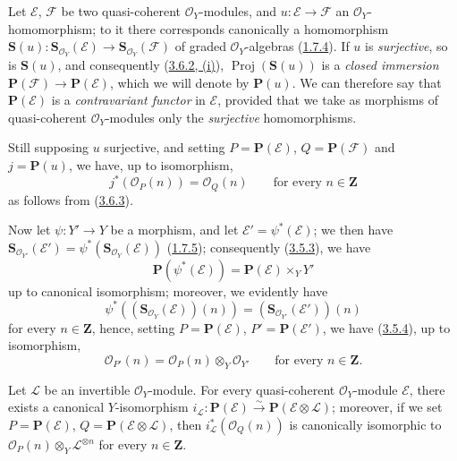 \begin{env}[4.1.2]
\label{II.4.1.2}
Let $\mathcal{E}$, $\mathcal{F}$ be two quasi-coherent
$\mathcal{O}_Y$-modules, and $u:\mathcal{E}\to\mathcal{F}$ an
$\mathcal{O}_Y$-homomorphism; to it there corresponds canonically a
homomorphism
$\mathbf{S}(u):\mathbf{S}_{\mathcal{O}_Y}(\mathcal{E})\to
\mathbf{S}_{\mathcal{O}_Y}(\mathcal{F})$ of graded
$\mathcal{O}_Y$-algebras (\hyperref[II.1.7.4]{1.7.4}). If $u$ is
\emph{surjective}, so is $\mathbf{S}(u)$, and consequently
(\hyperref[II.3.6.2]{3.6.2, (i)}),
$\operatorname{Proj}(\mathbf{S}(u))$ is a \emph{closed immersion}
$\mathbf{P}(\mathcal{F})\to\mathbf{P}(\mathcal{E})$, which we will denote by
$\mathbf{P}(u)$. We can therefore say that $\mathbf{P}(\mathcal{E})$ is a
\emph{contravariant functor} in $\mathcal{E}$, provided that we take as
morphisms of quasi-coherent $\mathcal{O}_Y$-modules only the \emph{surjective}
homomorphisms.

Still supposing $u$ surjective, and setting
$P=\mathbf{P}(\mathcal{E})$, $Q=\mathbf{P}(\mathcal{F})$ and
$j=\mathbf{P}(u)$, we have, up to isomorphism,
\[
\label{II.4.1.2.1}
  j^*(\mathcal{O}_P(n))=\mathcal{O}_Q(n)
  \qquad\text{for every }n\in\mathbf{Z}
\tag{4.1.2.1}
\]
as follows from (\hyperref[II.3.6.3]{3.6.3}).
\end{env}

\begin{env}[4.1.3]
\label{II.4.1.3}
Now let $\psi:Y'\to Y$ be a morphism, and let
$\mathcal{E}'=\psi^*(\mathcal{E})$; we then have
$\mathbf{S}_{\mathcal{O}_{Y'}}(\mathcal{E}')=
\psi^*(\mathbf{S}_{\mathcal{O}_Y}(\mathcal{E}))$
(\hyperref[II.1.7.5]{1.7.5}); consequently
(\hyperref[II.3.5.3]{3.5.3}), we have
\[
\label{II.4.1.3.1}
  \mathbf{P}(\psi^*(\mathcal{E}))=
  \mathbf{P}(\mathcal{E})\times_YY'
\tag{4.1.3.1}
\]
up to canonical isomorphism; moreover, we evidently have
\[
  \psi^*((\mathbf{S}_{\mathcal{O}_Y}(\mathcal{E}))(n))
  =(\mathbf{S}_{\mathcal{O}_{Y'}}(\mathcal{E}'))(n)
\]
for every $n\in\mathbf{Z}$, hence, setting $P=\mathbf{P}(\mathcal{E})$,
$P'=\mathbf{P}(\mathcal{E}')$, we have
(\hyperref[II.3.5.4]{3.5.4}), up to isomorphism,
\[
\label{II.4.1.3.2}
  \mathcal{O}_{P'}(n)=\mathcal{O}_P(n)\otimes_Y\mathcal{O}_{Y'}
  \qquad\text{for every }n\in\mathbf{Z}.
\tag{4.1.3.2}
\]
\end{env}


\begin{proposition}[4.1.4]
\label{II.4.1.4}
Let $\mathcal{L}$ be an invertible $\mathcal{O}_Y$-module. For every
quasi-coherent $\mathcal{O}_Y$-module $\mathcal{E}$, there exists a canonical
$Y$-isomorphism
$i_{\mathcal{L}}:\mathbf{P}(\mathcal{E})\xrightarrow{\sim}
\mathbf{P}(\mathcal{E}\otimes\mathcal{L})$; moreover, if we set
$P=\mathbf{P}(\mathcal{E})$, $Q=\mathbf{P}(\mathcal{E}\otimes\mathcal{L})$,
then $i_{\mathcal{L}}^*(\mathcal{O}_Q(n))$ is canonically isomorphic to
$\mathcal{O}_P(n)\otimes_Y\mathcal{L}^{\otimes n}$ for every
$n\in\mathbf{Z}$.
\end{proposition}

